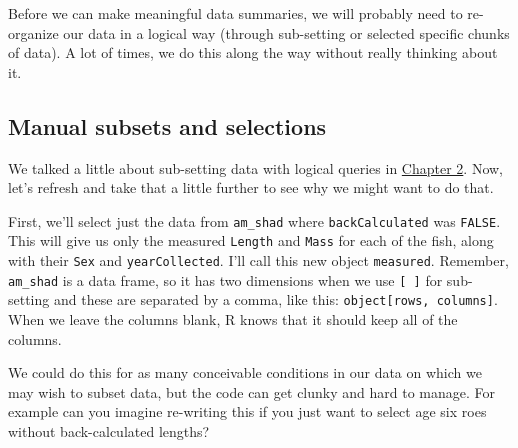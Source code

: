 \documentclass[
]{book}
\newenvironment{Shaded}{\begin{snugshade}}{\end{snugshade}}
\newcommand{\CommentTok}[1]{\textcolor[rgb]{0.56,0.35,0.01}{\textit{#1}}}
\newcommand{\DecValTok}[1]{\textcolor[rgb]{0.00,0.00,0.81}{#1}}
\newcommand{\NormalTok}[1]{#1}
\newcommand{\OperatorTok}[1]{\textcolor[rgb]{0.81,0.36,0.00}{\textbf{#1}}}
\newcommand{\OtherTok}[1]{\textcolor[rgb]{0.56,0.35,0.01}{#1}}
\newcommand{\StringTok}[1]{\textcolor[rgb]{0.31,0.60,0.02}{#1}}
\begin{document}
Before we can make meaningful data summaries, we will probably need to re-organize our data in a logical way (through sub-setting or selected specific chunks of data). A lot of times, we do this along the way without really thinking about it.

\hypertarget{manual-subsets-and-selections}{%
\subsection{Manual subsets and selections}\label{manual-subsets-and-selections}}

We talked a little about sub-setting data with logical queries in \protect\hyperlink{Chapter2}{Chapter 2}. Now, let's refresh and take that a little further to see why we might want to do that.

First, we'll select just the data from \texttt{am\_shad} where \texttt{backCalculated} was \texttt{FALSE}. This will give us only the measured \texttt{Length} and \texttt{Mass} for each of the fish, along with their \texttt{Sex} and \texttt{yearCollected}. I'll call this new object \texttt{measured}. Remember, \texttt{am\_shad} is a data frame, so it has two dimensions when we use \texttt{{[}\ {]}} for sub-setting and these are separated by a comma, like this: \texttt{object{[}rows,\ columns{]}}. When we leave the columns blank, R knows that it should keep all of the columns.

\begin{Shaded}
\end{Shaded}

We could do this for as many conceivable conditions in our data on which we may wish to subset data, but the code can get clunky and hard to manage. For example can you imagine re-writing this if you just want to select age six roes without back-calculated lengths?

\begin{Shaded}
\end{Shaded}
\end{document}
